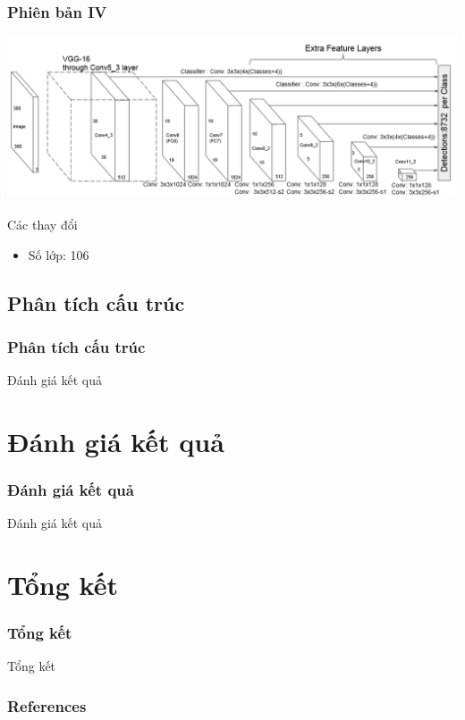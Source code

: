 \documentclass{beamer}
\begin{document}
	\begin{frame}
		\frametitle{Phiên bản IV}
		\begin{center}
			\centering
			\includegraphics[width=0.95\linewidth]{SSD_Struture.png}
		\end{center}
		\begin{block}{Các thay đổi}
			\begin{itemize}
				\item Số lớp: 106
			\end{itemize}
		\end{block}
	\end{frame}
	
	
	\subsection{Phân tích cấu trúc}
	\begin{frame}
		\frametitle{Phân tích cấu trúc}
		{\Huge Đánh giá kết quả}
	\end{frame}
	
	
	
	
	
	
	\section{Đánh giá kết quả}
	\begin{frame}
		\frametitle{Đánh giá kết quả}
		{\Huge Đánh giá kết quả}
	\end{frame}
	
	\section{Tổng kết}
	\begin{frame}
		\frametitle{Tổng kết}
		{\Huge Tổng kết}
	\end{frame}
	
	\begin{frame}
		\frametitle{References}
		\printbibliography
	\end{frame}
	
	
	
	\begin{frame}
		\Huge{\centering{The End}}
	\end{frame}
	
	
\end{document}
